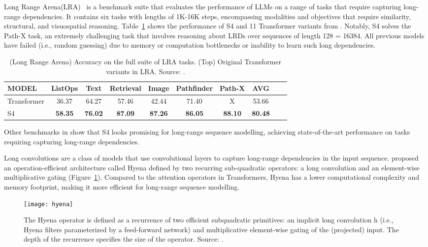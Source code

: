 Long Range Arena(LRA)~\cite{tay2021longrange} is a benchmark suite that evaluates the performance of LLMs on a range of tasks that require capturing long-range dependencies.
It contains six tasks with lengths of 1K-16K steps, encompassing modalities and objectives that require similarity, structural, and visuospatial reasoning.
Table~\ref{tab:LRA} shows the performance of S4 and 11 Transformer variants from \textcite{tay2021longrange}.
Notably, S4 solves the Path-X task, an extremely challenging task that involves reasoning about LRDs over sequences of length 128  = 16384.
All previous models have failed (i.e., random guessing) due to memory or computation bottlenecks or inability to learn such long dependencies.
\begin{table}[htbp]
	\centering
	\begin{tabularx}{\textwidth}{Xccccccccc}
		\toprule
		MODEL       & ListOps        & Text           & Retrieval      & Image          & Pathfinder     & Path-X         & AVG            \\
		\midrule
		Transformer & 36.37          & 64.27          & 57.46          & 42.44          & 71.40          & X              & 53.66          \\
		\addlinespace
		S4          & \textbf{58.35} & \textbf{76.02} & \textbf{87.09} & \textbf{87.26} & \textbf{86.05} & \textbf{88.10} & \textbf{80.48} \\
		\bottomrule
	\end{tabularx}
	\caption{(Long Range Arena) Accuracy on the full suite of LRA tasks. (Top) Original Transformer variants in LRA. Source: \textcite{gu2022efficiently}.}
	\label{tab:LRA}
\end{table}
Other benchmarks in \textcite{gu2022efficiently} show that S4 looks promising for long-range sequence modelling, achieving state-of-the-art performance on tasks requiring capturing long-range dependencies.

Long convolutions are a class of models that use convolutional layers to capture long-range dependencies in the input sequence. \textcite{poli2023hyena} proposed an operation-efficient architecture called Hyena defined by two recurring sub-quadratic operators: a long convolution and an element-wise multiplicative gating (Figure~\ref{fig:hyena}).
Compared to the attention operators in Transformers, Hyena has a lower computational complexity and memory footprint, making it more efficient for long-range sequence modelling.

\begin{figure}[h]
	\centering
	\texttt{[image: hyena]}
	\caption{The Hyena operator is defined as a recurrence of two efficient subquadratic primitives: an implicit long convolution h (i.e., Hyena filters parameterized by a feed-forward network) and multiplicative element-wise gating of the (projected) input. The depth of the recurrence specifies the size of the operator. Source: \textcite{poli2023hyena}.}
	\label{fig:hyena}
\end{figure}

